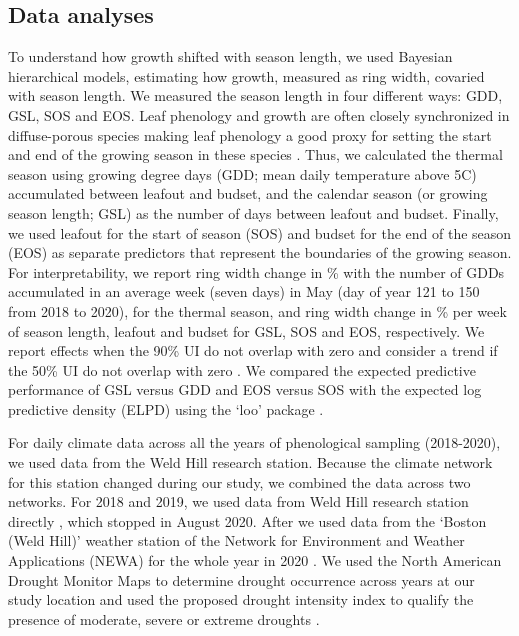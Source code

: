 \documentclass{article}\usepackage[]{graphicx}\usepackage[]{xcolor}
\begin{document}
\subsection*{Data analyses}
To understand how growth shifted with season length, we used Bayesian hierarchical models, estimating how growth, measured as ring width, covaried with season length. We measured the season length in four different ways: GDD, GSL, SOS and EOS. Leaf phenology and growth are often closely synchronized in diffuse-porous species \citep[e.g., \textit{Betula;}][]{cufar_treering_2008} making leaf phenology a good proxy for setting the start and end of the growing season in these species \citep{marchand_timing_2021,silvestro_roots_2025,suzuki_phenological_1996}. Thus, we calculated the thermal season using growing degree days (GDD; mean daily temperature above 5\degree C) accumulated between leafout and budset, and the calendar season (or growing season length; GSL) as the number of days between leafout and budset. Finally, we used leafout for the start of season (SOS) and budset for the end of the season (EOS) as separate predictors that represent the boundaries of the growing season. For interpretability, we report ring width change in \% with the number of GDDs accumulated in an average week (seven days) in May (day of year 121 to 150 from 2018 to 2020), for the thermal season, and ring width change in \% per week of season length, leafout and budset for GSL, SOS and EOS, respectively. We report effects when the 90\% UI do not overlap with zero and consider a trend if the 50\% UI do not overlap with zero \citep{gelman_regression_2020}. We compared the expected predictive performance of GSL versus GDD and EOS versus SOS with the expected log predictive density (ELPD) using the `loo' package \citep{vehtari_practical_2017}.

For daily climate data across all the years of phenological sampling (2018-2020), we used data from the Weld Hill research station. Because the climate network for this station changed during our study, we combined the data across two networks. For 2018 and 2019, we used data from Weld Hill research station directly \citep{arnoldarboretum_weather_2026}, which stopped in August 2020. After we used data from the `Boston (Weld Hill)' weather station of the Network for Environment and Weather Applications (NEWA) for the whole year in 2020 \citep[see Figure \ref{fig:climOverlap} for the climate overlap between the two stations in 2020;][]{carroll_network_2026}. We used the North American Drought Monitor Maps to determine drought occurrence across years at our study location and used the proposed drought intensity index to qualify the presence of moderate, severe or extreme droughts \citep{nationalcentersforenvironmentalinformationncei_north_2026}. 
\end{document}

